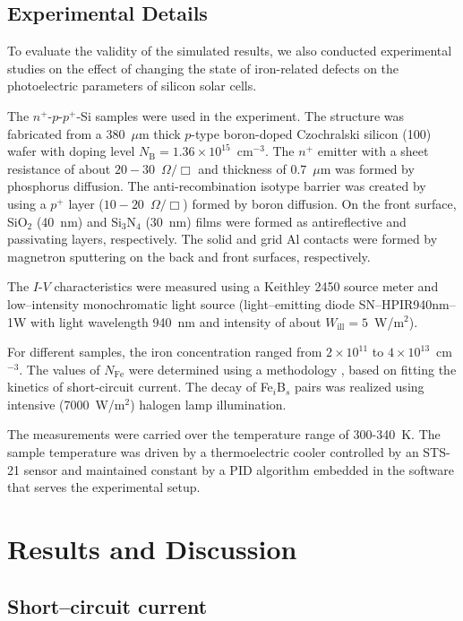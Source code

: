 \documentclass[a4paper,fleqn]{cas-sc}
\begin{document}
\subsection{Experimental Details}

To evaluate the validity of the simulated results,
we also conducted experimental studies on the effect of changing the state of iron-related defects on the photoelectric parameters of silicon solar cells.

The $n^+$-$p$-$p^+$-Si samples were used in the experiment.
The structure was fabricated from a 380~$\mu$m thick $p$-type boron-doped
Czochralski silicon (100) wafer with doping level $N_\mathrm{B}=1.36\times10^{15}$~cm$^{-3}$.
The $n^+$ emitter with a sheet resistance of about $20-30$~$\Omega/\Box$
and  thickness of $0.7$~$\mu$m was formed by phosphorus diffusion.
The anti-recombination isotype barrier was created by using a $p^+$
layer ($10-20$~$\Omega/\Box$) formed by boron diffusion.
On the front surface, SiO$_2$ (40~nm) and Si$_3$N$_4$ (30~nm) films were formed as antireflective and passivating layers, respectively.
The solid and grid Al contacts were formed by magnetron sputtering on the back and front surfaces, respectively.

The $I$-$V$ characteristics were measured using a Keithley 2450 source meter and
low--intensity monochromatic light source (light--emitting diode SN--HPIR940nm--1W with light wavelength 940~nm and intensity of about  $W_\mathrm{ill} = 5$~W/m$^{2}$).

For different samples, the iron concentration ranged from $2\times10^{11}$ to $4\times10^{13}$~cm$^{-3}$.
The values of $N_\mathrm{Fe}$ were determined using a methodology \cite{Olikh2022:JMatSci,Olikh2021JAP}, based on fitting the kinetics of short-circuit current.
The decay of Fe$_i$B$_s$ pairs was realized using intensive (7000~W/$\mathrm{m}^{2}$) halogen lamp illumination.

The measurements were carried over the temperature range of 300-340~K.
The sample temperature was driven by a thermoelectric cooler controlled by an STS-21 sensor
and maintained constant by a PID algorithm embedded in the software that serves the experimental setup.


\section{Results and Discussion}%

\subsection{Short--circuit current}
\end{document}
